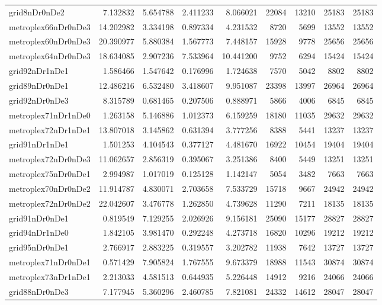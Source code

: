\begin{longtable}{|l|r|r|r|r|r|r|r|r|}
grid8nDr0nDe2 & 7.132832 & 5.654788 & 2.411233 & 8.066021 & 22084 & 13210 & 25183 & 25183 \\
metroplex66nDr0nDe3 & 14.202982 & 3.334198 & 0.897334 & 4.231532 & 8720 & 5699 & 13552 & 13552 \\
metroplex60nDr0nDe3 & 20.390977 & 5.880384 & 1.567773 & 7.448157 & 15928 & 9778 & 25656 & 25656 \\
metroplex64nDr0nDe3 & 18.634085 & 2.907236 & 7.533964 & 10.441200 & 9752 & 6294 & 15424 & 15424 \\
grid92nDr1nDe1 & 1.586466 & 1.547642 & 0.176996 & 1.724638 & 7570 & 5042 & 8802 & 8802 \\
grid89nDr0nDe1 & 12.486216 & 6.532480 & 3.418607 & 9.951087 & 23398 & 13997 & 26964 & 26964 \\
grid92nDr0nDe3 & 8.315789 & 0.681465 & 0.207506 & 0.888971 & 5866 & 4006 & 6845 & 6845 \\
metroplex71nDr1nDe0 & 1.263158 & 5.146886 & 1.012373 & 6.159259 & 18180 & 11035 & 29632 & 29632 \\
metroplex72nDr1nDe1 & 13.807018 & 3.145862 & 0.631394 & 3.777256 & 8388 & 5441 & 13237 & 13237 \\
grid91nDr1nDe1 & 1.501253 & 4.104543 & 0.377127 & 4.481670 & 16922 & 10454 & 19404 & 19404 \\
metroplex72nDr0nDe3 & 11.062657 & 2.856319 & 0.395067 & 3.251386 & 8400 & 5449 & 13251 & 13251 \\
metroplex75nDr0nDe1 & 2.994987 & 1.017019 & 0.125128 & 1.142147 & 5054 & 3482 & 7663 & 7663 \\
metroplex70nDr0nDe2 & 11.914787 & 4.830071 & 2.703658 & 7.533729 & 15718 & 9667 & 24942 & 24942 \\
metroplex72nDr0nDe2 & 22.042607 & 3.476778 & 1.262850 & 4.739628 & 11290 & 7211 & 18135 & 18135 \\
grid91nDr0nDe1 & 0.819549 & 7.129255 & 2.026926 & 9.156181 & 25090 & 15177 & 28827 & 28827 \\
grid94nDr1nDe0 & 1.842105 & 3.981470 & 0.292248 & 4.273718 & 16820 & 10296 & 19212 & 19212 \\
grid95nDr0nDe1 & 2.766917 & 2.883225 & 0.319557 & 3.202782 & 11938 & 7642 & 13727 & 13727 \\
metroplex71nDr0nDe1 & 0.571429 & 7.905824 & 1.767555 & 9.673379 & 18988 & 11543 & 30874 & 30874 \\
metroplex73nDr1nDe1 & 2.213033 & 4.581513 & 0.644935 & 5.226448 & 14912 & 9216 & 24066 & 24066 \\
grid88nDr0nDe3 & 7.177945 & 5.360296 & 2.460785 & 7.821081 & 24332 & 14612 & 28047 & 28047 \\

\end{longtable}
